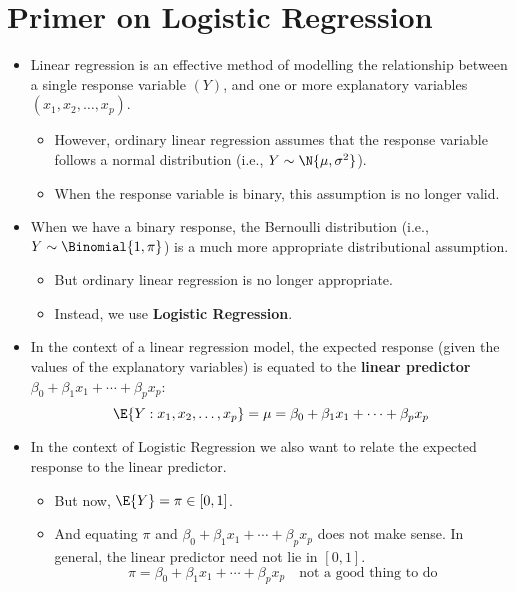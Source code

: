 \section*{Primer on Logistic Regression}
\begin{itemize}
    \item Linear regression is an effective method of modelling the relationship between a single response variable
          $ (Y) $, and one or more explanatory variables $ (x_1,x_2,\ldots,x_p) $.
          \begin{itemize}
              \item However, ordinary linear regression assumes that the response variable follows a normal distribution
                    (i.e., $ Y \sim \N{\mu,\sigma^2} $).
              \item When the response variable is binary, this assumption is no longer valid.
          \end{itemize}
    \item When we have a binary response, the Bernoulli distribution (i.e., $ Y \sim \Binomial{1,\pi} $) is a much more
          appropriate distributional assumption.
          \begin{itemize}
              \item But ordinary linear regression is no longer appropriate.
              \item Instead, we use \textbf{Logistic Regression}.
          \end{itemize}
    \item In the context of a linear regression model, the expected response (given
          the values of the explanatory variables) is equated to the \textbf{linear predictor} $ \beta_0+\beta_1x_1+\cdots+\beta_p x_p $:
          \[ \E{Y\given x_1,x_2,\ldots,x_p}=\mu=\beta_0+\beta_1x_1+\cdots+\beta_p x_p \]
    \item In the context of Logistic Regression we also want to relate the expected response to the linear predictor.
          \begin{itemize}
              \item But now, $ \E{Y}=\pi\in[0,1] $.
              \item And equating $ \pi $ and $ \beta_0+\beta_1 x_1+\cdots+\beta_p x_p $ does not make sense. In general, the linear predictor need not lie in $ [0,1] $.
                    \[ \pi=\beta_0+\beta_1x_1+\cdots+\beta_p x_p\quad\text{not a good thing to do} \]
          \end{itemize}

\end{itemize}

